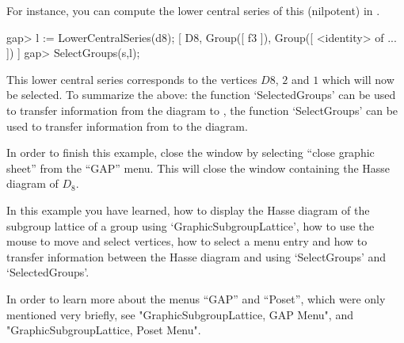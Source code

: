 For instance,  you can compute the lower central series of this (nilpotent) 
in {\GAP}.

\begintt
gap> l := LowerCentralSeries(d8);
[ D8, Group([ f3 ]), Group([ <identity> of ... ]) ]
gap> SelectGroups(s,l);
\endtt

This lower central series corresponds to the vertices $D8$, $2$ and $1$
which will now be selected.  To summarize the above: the function
`SelectedGroups' can be used to transfer information from the diagram to
{\GAP}, the function `SelectGroups' can be used to transfer information
from {\GAP} to the diagram.




In order to finish this example, close the window by selecting ``close
graphic sheet'' from the ``GAP'' menu.  This will close the window
containing the Hasse diagram of $D_8$.

In this example you have learned, how to display the Hasse diagram of the
subgroup lattice of a group using `GraphicSubgroupLattice', how to use the
mouse to move and select vertices, how to select a menu entry and how to
transfer information between the Hasse diagram and {\GAP} using `SelectGroups'
and `SelectedGroups'.

In order to learn more about the menus ``GAP'' and ``Poset'', which were only
mentioned very briefly, see "GraphicSubgroupLattice, GAP Menu", and
"GraphicSubgroupLattice, Poset Menu".  


